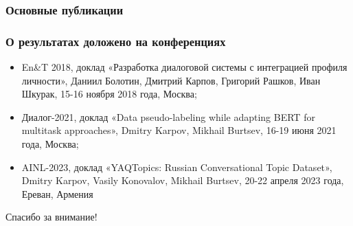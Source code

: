 \iffalse
\begin{frame}
    \frametitle{Акт о внедрении}
    \begin{figure}[h]
        \centering
        \fbox{
            \begin{minipage}[t]{0.4\linewidth}
                \texttt{[image: implementation]}
            \end{minipage}
        }
    \end{figure}
\end{frame}
\note{
    Получен акт о внедрении.
}
\fi

\begin{frame}[t,allowframebreaks] %
    \frametitle{Основные публикации}
    \nocite{pseudolabel}
    \nocite{rumtl}%
    \nocite{enmtl}%
    \nocite{rutopics}
    \nocite{dream1}
    \nocite{dream1_trudy}
    \nocite{dream2}
    \nocite{dp_2023}
\end{frame}

\begin{frame}
    \frametitle{О результатах доложено на конференциях}
    \begin{itemize}
   \item En\&T 2018, доклад «Разработка диалоговой системы с интеграцией профиля личности», Даниил Болотин, Дмитрий Карпов, Григорий Рашков, Иван Шкурак, 15-16 ноября 2018 года, Москва;
   \item Диалог-2021, доклад «Data pseudo-labeling while adapting BERT for multitask approaches», Dmitry Karpov, Mikhail Burtsev, 16-19 июня 2021 года, Москва;
   \item AINL-2023, доклад «YAQTopics: Russian Conversational Topic Dataset», Dmitry Karpov, Vasily Konovalov, Mikhail Burtsev, 20-22 апреля 2023 года, Ереван, Армения
    \end{itemize}
\end{frame}
\note{
}

\begin{frame} %
    \begin{center}
        \Huge
        Спасибо за внимание!
    \end{center}
\end{frame}
